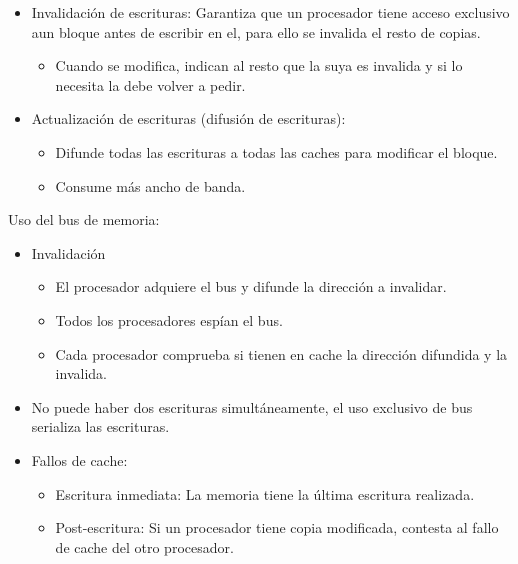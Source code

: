 \documentclass[12pt, twoside, openright]{report} %
\begin{document}
    \begin{itemize}
    
    \item
      Invalidación de escrituras: Garantiza que un procesador tiene
      acceso exclusivo aun bloque antes de escribir en el, para ello
      se invalida el resto de copias.

      \begin{itemize}
      
      \item
        Cuando se modifica, indican al resto que la suya es invalida y
        si lo necesita la debe volver a pedir.
      \end{itemize}
    \item
      Actualización de escrituras (difusión de escrituras):

      \begin{itemize}
      
      \item
        Difunde todas las escrituras a todas las caches para modificar
        el bloque.
      \item
        Consume más ancho de banda.
      \end{itemize}
    \end{itemize}

    Uso del bus de memoria:

    \begin{itemize}
    
    \item
      Invalidación

      \begin{itemize}
      
      \item
        El procesador adquiere el bus y difunde la dirección a
        invalidar.
      \item
        Todos los procesadores espían el bus.
      \item
        Cada procesador comprueba si tienen en cache la dirección
        difundida y la invalida.
      \end{itemize}
    \item
      No puede haber dos escrituras simultáneamente, el uso exclusivo
      de bus serializa las escrituras.
    \item
      Fallos de cache:

      \begin{itemize}
      
      \item
        Escritura inmediata: La memoria tiene la última escritura
        realizada.
      \item
        Post-escritura: Si un procesador tiene copia modificada,
        contesta al fallo de cache del otro procesador.
      \end{itemize}
    \end{itemize}
\end{document}
